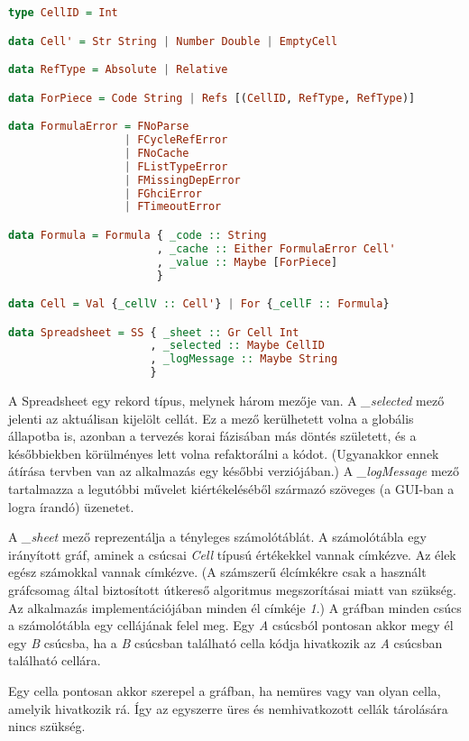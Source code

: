 \begin{lstlisting}[language={Haskell}]
type CellID = Int

data Cell' = Str String | Number Double | EmptyCell

data RefType = Absolute | Relative

data ForPiece = Code String | Refs [(CellID, RefType, RefType)]

data FormulaError = FNoParse
                  | FCycleRefError
                  | FNoCache
                  | FListTypeError
                  | FMissingDepError
                  | FGhciError
                  | FTimeoutError

data Formula = Formula { _code :: String
                       , _cache :: Either FormulaError Cell'
                       , _value :: Maybe [ForPiece]
                       }

data Cell = Val {_cellV :: Cell'} | For {_cellF :: Formula}

data Spreadsheet = SS { _sheet :: Gr Cell Int
                      , _selected :: Maybe CellID
                      , _logMessage :: Maybe String
                      }
\end{lstlisting}

A Spreadsheet egy rekord típus, melynek három mezője van. A \textit{\_selected} mező jelenti az aktuálisan kijelölt cellát. Ez a mező kerülhetett volna a globális állapotba is, azonban a tervezés korai fázisában más döntés született, és a későbbiekben körülményes lett volna refaktorálni a kódot. (Ugyanakkor ennek átírása tervben van az alkalmazás egy későbbi verziójában.) A \textit{\_logMessage} mező tartalmazza a legutóbbi művelet kiértékeléséből származó szöveges (a GUI-ban a logra írandó) üzenetet.

A \textit{\_sheet} mező reprezentálja a tényleges számolótáblát. A számolótábla egy irányított gráf, aminek a csúcsai \textit{Cell} típusú értékekkel vannak címkézve. Az élek egész számokkal vannak címkézve. (A számszerű élcímkékre csak a használt gráfcsomag által biztosított útkereső algoritmus megszorításai miatt van szükség. Az alkalmazás implementációjában minden él címkéje \textit{1}.) A gráfban minden csúcs a számolótábla egy cellájának felel meg. Egy \textit{A} csúcsból pontosan akkor megy él egy \textit{B} csúcsba, ha a \textit{B} csúcsban található cella kódja hivatkozik az \textit{A} csúcsban található cellára. 

Egy cella pontosan akkor szerepel a gráfban, ha nemüres vagy van olyan cella, amelyik hivatkozik rá. Így az egyszerre üres és nemhivatkozott cellák tárolására nincs szükség.

